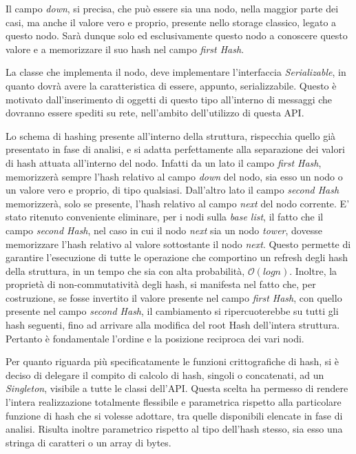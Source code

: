 	Il campo \textit{down}, si precisa, che può essere sia una nodo, nella maggior parte dei casi, ma anche il valore vero e proprio, presente nello storage classico, legato a questo nodo. Sarà dunque solo ed esclusivamente questo nodo a conoscere questo valore e a memorizzare il suo hash nel campo \textit{first Hash}.
	
	La classe che implementa il nodo, deve implementare l'interfaccia \textit{Serializable}, in quanto dovrà avere la caratteristica di essere, appunto, serializzabile. Questo è motivato dall'inserimento di oggetti di questo tipo all'interno di messaggi che dovranno essere spediti su rete, nell'ambito dell'utilizzo di questa API.
	
	Lo schema di hashing presente all'interno della struttura, rispecchia quello già presentato in fase di analisi, e si adatta perfettamente alla separazione dei valori di hash attuata all'interno del nodo. Infatti da un lato il campo \textit{first Hash}, memorizzerà sempre l'hash relativo al campo \textit{down} del nodo, sia esso un nodo o un valore vero e proprio, di tipo qualsiasi. Dall'altro lato il campo \textit{second Hash} memorizzerà, solo se presente, l'hash relativo al campo \textit{next} del nodo corrente. 
	E' stato ritenuto conveniente eliminare, per i nodi sulla \textit{base list}, il fatto che il campo \textit{second Hash}, nel caso in cui il nodo \textit{next} sia un nodo \textit{tower}, dovesse memorizzare l'hash relativo al valore sottostante il nodo \textit{next}. Questo permette di garantire l'esecuzione di tutte le operazione che comportino un refresh degli hash della struttura, in un tempo che sia con alta probabilità, $\mathcal{O}(log{}n)$.
	Inoltre, la proprietà di non-commutatività degli hash, si manifesta nel fatto che, per costruzione, se fosse invertito il valore presente nel campo \textit{first Hash}, con quello presente nel campo \textit{second Hash}, il cambiamento si ripercuoterebbe su tutti gli hash seguenti, fino ad arrivare alla modifica del root Hash dell'intera struttura. Pertanto è fondamentale l'ordine e la posizione reciproca dei vari nodi.
	
	Per quanto riguarda più specificatamente le funzioni crittografiche di hash, si è deciso di delegare il compito di calcolo di hash, singoli o concatenati, ad un \textit{Singleton}, visibile a tutte le classi dell'API. Questa scelta ha permesso di rendere l'intera realizzazione totalmente flessibile e parametrica rispetto alla particolare funzione di hash che si volesse adottare, tra quelle disponibili elencate in fase di analisi. Risulta inoltre parametrico rispetto al tipo dell'hash stesso, sia esso una stringa di caratteri o un array di bytes.
	
